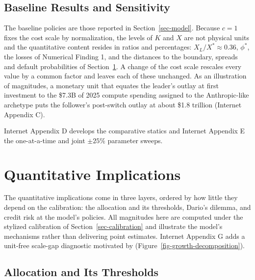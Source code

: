 \documentclass[
  11pt,
  letterpaper,
]{scrartcl}
\begin{document}
\subsection{Baseline Results and
Sensitivity}\label{baseline-results-and-sensitivity}

The baseline policies are those reported in Section~\ref{sec-model}.
Because \(c = 1\) fixes the cost scale by normalization, the levels of
\(K\) and \(X\) are not physical units and the quantitative content
resides in ratios and percentages: \(X_L/X^* \approx 0.36\), \(\phi^*\),
the losses of Numerical Finding 1, and the distances to the boundary,
spreads and default probabilities of Section~\ref{sec-valuation}. A
change of the cost scale rescales every value by a common factor and
leaves each of these unchanged. As an illustration of magnitudes, a
monetary unit that equates the leader's outlay at first investment to
the \$7.3B of 2025 compute spending assigned to the Anthropic-like
archetype puts the follower's post-switch outlay at about \$1.8 trillion
(Internet Appendix C).

Internet Appendix D develops the comparative statics and Internet
Appendix E the one-at-a-time and joint \(\pm 25\%\) parameter sweeps.

\section{Quantitative Implications}\label{sec-valuation}

The quantitative implications come in three layers, ordered by how
little they depend on the calibration: the allocation and its
thresholds, Dario's dilemma, and credit risk at the model's policies.
All magnitudes here are computed under the stylized calibration of
Section~\ref{sec-calibration} and illustrate the model's mechanisms
rather than delivering point estimates. Internet Appendix G adds a
unit-free scale-gap diagnostic motivated by \citet{berk1999optimal}
(Figure~\ref{fig-growth-decomposition}).

\subsection{Allocation and Its
Thresholds}\label{allocation-and-its-thresholds}
\end{document}
